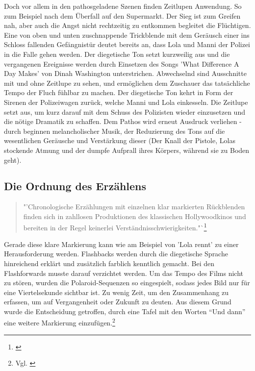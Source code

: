 Doch vor allem in den pathosgeladene Szenen finden Zeitlupen Anwendung. So zum Beispiel nach dem Überfall auf den Supermarkt. Der Sieg ist zum Greifen nah, aber auch die Angst nicht rechtzeitig zu entkommen begleitet die Flüchtigen. Eine von oben und unten zuschnappende Trickblende mit dem Geräusch einer ins Schloss fallenden Gefängnistür deutet bereits an, dass Lola und Manni der Polizei in die Falle gehen werden.  Der diegetische Ton setzt kurzweilig aus und die vergangenen Ereignisse werden durch Einsetzen des Songs 'What Difference A Day Makes' von Dinah Washington unterstrichen. Abwechselnd sind Ausschnitte mit und ohne Zeitlupe zu sehen, und ermöglichen dem Zuschauer das tatsächliche Tempo der Fluch fühlbar zu machen. Der diegetische Ton kehrt in Form der Sirenen  der Polizeiwagen zurück, welche Manni und Lola einkesseln. Die Zeitlupe setzt aus, um kurz darauf mit dem Schuss des Polizisten wieder einzusetzen und die nötige Dramatik zu schaffen. Dem Pathos wird erneut Ausdruck verliehen - durch beginnen melancholischer Musik, der Reduzierung des Tons auf die wesentlichen Geräusche und Verstärkung dieser (Der Knall der Pistole, Lolas stockende Atmung und der dumpfe Aufprall ihres Körpers, während sie zu Boden geht). 

\subsection{Die Ordnung des Erzählens}

\begin{quote}"'Chronologische Erzählungen mit einzelnen klar markierten Rückblenden finden sich in zahllosen Produktionen des klassischen Hollywoodkinos und bereiten in der Regel keinerlei Verständnisschwierigkeiten."`\footnote{\cite[S. 204]{keutzer2014filmanalyse}}\end{quote}
Gerade diese klare Markierung kann wie am Beispiel von 'Lola rennt' zu einer Herausforderung werden. Flashbacks werden durch die diegetische Sprache hinreichend erklärt und zusätzlich farblich kenntlich gemacht. Bei den Flashforwards musste darauf verzichtet werden. Um das Tempo des Films nicht zu stören, wurden die Polaroid-Sequenzen so eingespielt, sodass jedes Bild nur für eine Viertelsekunde sichtbar ist. Zu wenig Zeit, um den Zusammenhang zu erfassen, um auf Vergangenheit oder Zukunft zu deuten. Aus diesem Grund wurde die Entscheidung getroffen, durch eine Tafel mit den Worten "`Und dann"' eine weitere Markierung einzufügen.\footnote{Vgl. \cite[S. 7]{DIEDRINGLICHKEITDERLIEBE}} 

